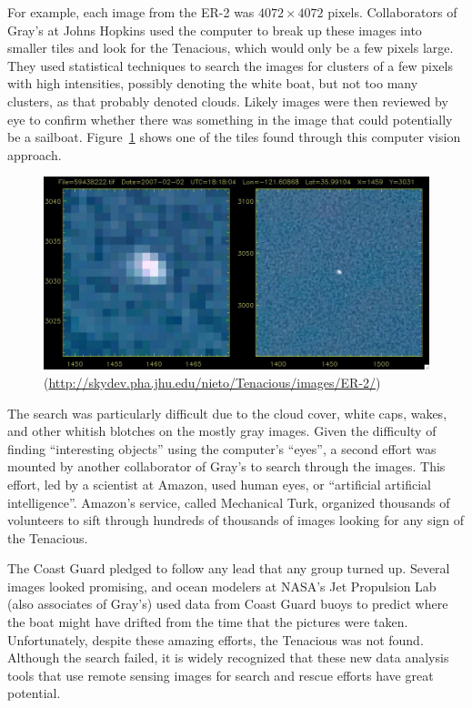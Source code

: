 For example, each image from the ER-2 was $4072 \times 4072$
pixels. Collaborators of Gray's at Johns Hopkins used the computer to
break up these images into smaller tiles and look for the Tenacious,
which would only be a few pixels large.  They used statistical
techniques to search the images for clusters of a few pixels with high
intensities, possibly denoting the white boat, but not too many
clusters, as that probably denoted clouds. Likely images were then
reviewed by eye to confirm whether there was something in the image
that could potentially be a sailboat.  Figure~\ref{fig:tenacious}
shows one of the tiles found through this computer vision approach.

\begin{figure}
 \includegraphics[width=6in]{Introduction/images/tenacious/ER-2.jpg}
  \caption{ (\url{http://skydev.pha.jhu.edu/nieto/Tenacious/images/ER-2/})}
\label{fig:tenacious}
\end{figure}

The search was particularly difficult due to the cloud cover, white
caps, wakes, and other whitish blotches on the mostly gray images.
Given the difficulty of finding ``interesting objects'' using the
computer's ``eyes'', a second effort was mounted by another
collaborator of Gray's to search through the images.  This effort, led
by a scientist at Amazon, used human eyes, or ``artificial artificial
intelligence''.  Amazon's service, called Mechanical Turk, organized
thousands of volunteers to sift through hundreds of thousands of
images looking for any sign of the Tenacious.

The Coast Guard pledged to follow any lead that any group turned up.
Several images looked promising, and ocean modelers at NASA's Jet
Propulsion Lab (also associates of Gray's) used data from Coast Guard
buoys to predict where the boat might have drifted from the time that
the pictures were taken.  Unfortunately, despite these amazing
efforts, the Tenacious was not found. Although the search failed, it
is widely recognized that these new data analysis tools that use
remote sensing images for search and rescue efforts have great
potential.


